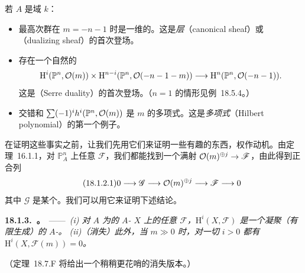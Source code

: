 若 $A$ 是域 $k$：
\begin{itemize}[leftmargin=2.6em,itemsep=2pt,topsep=3pt]
\item 最高次\trCohomology{}群在 $m=-n-1$ 时是一维的。这是\emph{\trCanonical{}层}（canonical sheaf）或\emph{\trDualizingSheaf}（dualizing sheaf）的首次登场。
\item 存在一个自然的\trPerfectPairing
\[
\mathrm{H}^i(\mathbb{P}^n,\mathcal{O}(m))\times\mathrm{H}^{n-i}(\mathbb{P}^n,\mathcal{O}(-n-1-m))\longrightarrow\mathrm{H}^n(\mathbb{P}^n,\mathcal{O}(-n-1)).
\]
这是\emph{\trSerreDuality}（Serre duality）的首次登场。（$n=1$ 的情形见\mbox{例~18.5.4}。）
\item 交错和 $\sum(-1)^i h^i(\mathbb{P}^n,\mathcal{O}(m))$ 是 $m$ 的多项式。这是\emph{\trHilbert{}多项式}（Hilbert polynomial）的第一个例子。
\end{itemize}

在证明这些事实之前，让我们先用它们来证明一些有趣的东西，权作动机。由\mbox{定理~16.1.1}，对 $\mathbb{P}^n_A$ 上任意\trCoherentSheaf{} $\mathscr{F}$，我们都能找到一个满射
$\mathcal{O}(m)^{\oplus j}\to\mathscr{F}$，由此得到正合列
\begin{equation*}\tag{18.1.2.1}\label{eq:coherent-sheaf-surjection}
0\longrightarrow \mathscr{G}\longrightarrow \mathcal{O}(m)^{\oplus j}\longrightarrow \mathscr{F}\longrightarrow 0
\end{equation*}
其中 $\mathscr{G}$ 是某个\trCoherentSheaf。我们可以用它来证明下述结论。

\textbf{18.1.3.\ \trhTheorem。}\ ——\ \emph{(i) 对 $A$ 为\trNoetherian{}的\trProjective{} $A$-\trScheme{} $X$ 上的任意\trCoherentSheaf{} $\mathscr{F}$，$\mathrm{H}^i(X,\mathscr{F})$ 是一个凝聚（有限生成）的 $A$-\trModule。
(ii)（\trSerre{}消失）此外，当 $m\gg 0$ 时，对一切 $i>0$ 都有 $\mathrm{H}^i(X,\mathscr{F}(m))=0$。}

（\mbox{定理~18.7.F} 将给出一个稍稍更花哨的\trSerre{}消失版本。）

